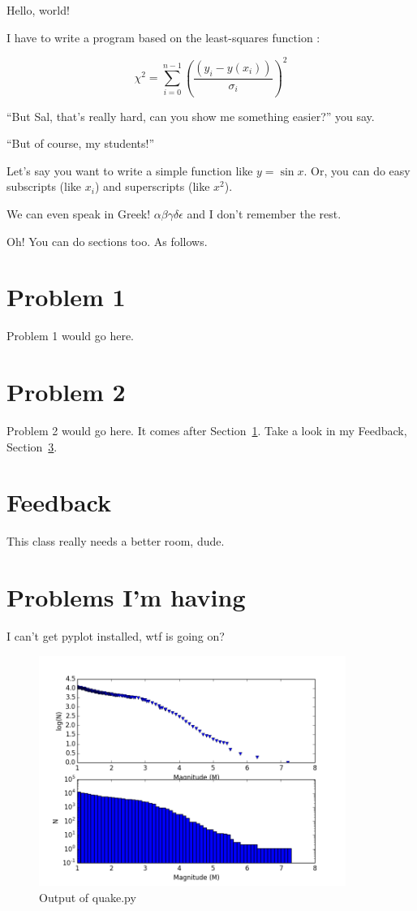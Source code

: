 \documentclass[10pt]{article}
\begin{document}
Hello, world!

I have to write a program based on the least-squares function : 

\begin{equation}
\chi^2 = \sum_{i=0}^{n-1} \left(\frac{(y_i - y(x_i))}{\sigma_i}\right)^2
\end{equation}

``But Sal, that's really hard, can you show me something easier?'' you say. 

``But of course, my students!''

Let's say you want to write a simple function like $y = \sin{x}$. Or, you can do easy subscripts (like $x_i$) and superscripts (like $x^2$). 

We can even speak in Greek! $\alpha\beta\gamma\delta\epsilon$ and I don't remember the rest. 

Oh! You can do sections too. As follows. 

\section{Problem 1}
\label{section1}

Problem 1 would go here. 

\section{Problem 2}

Problem 2 would go here. It comes after Section~\ref{section1}. Take a look in my Feedback, Section~\ref{feedback}. 

\section{Feedback}
\label{feedback}

This class really needs a better room, dude. 


\section{Problems I'm having}
\label{problems}

I can't get pyplot installed, wtf is going on? 



\begin{figure}[h!]
    \centering
    \includegraphics[width=100mm]{figure_1.png}
    \caption{\label{fig:quake}Output of quake.py }
\end{figure}
\end{document}
